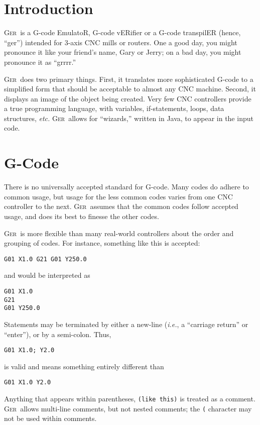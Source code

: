 \documentclass[titlepage,oneside,10pt]{article}
\newcommand{\ger}{\textsc{Ger}}
\begin{document}

\raggedbottom

\newcommand{\mymargin}[1]{\marginpar{\rm\tiny #1}}
\newcommand{\leftmar}[1]{\reversemarginpar \mymargin{#1}}

\section{Introduction}

\ger\ is a G-code EmulatoR, G-code vERifier or a G-code transpilER
(hence, ``ger'') intended for 3-axis CNC mills or routers. One a good
day, you might pronounce it like your friend's name, Gary or Jerry; on
a bad day, you might pronounce it as ``grrrr.''

\ger\ does two primary things. First, it translates more sophisticated
G-code to a simplified form that should be acceptable to almost any
CNC machine. Second, it displays an image of the object being
created. Very few CNC controllers provide a true programming language,
with variables, if-statements, loops, data structures, \emph{etc.}
\ger\ allows for ``wizards,'' written in Java, to appear in the input code. 


\section{G-Code}

There is no universally accepted standard for G-code. Many codes
do adhere to common usage, but usage for the less common codes varies
from one CNC controller to the next. \ger\ assumes that the common
codes follow accepted usage, and does its best to finesse the other
codes.

\ger\ is more flexible than many real-world controllers about the order
and grouping of codes. For instance, something like this is accepted:
\begin{verbatim}
G01 X1.0 G21 G01 Y250.0
\end{verbatim}
and would be interpreted as
\begin{verbatim}
G01 X1.0 
G21 
G01 Y250.0
\end{verbatim}
Statements may be terminated by either a new-line (\emph{i.e.}, a
``carriage return'' or ``enter''), or by a semi-colon. Thus,
\begin{verbatim}
G01 X1.0; Y2.0
\end{verbatim}
is valid and means something entirely different than 
\begin{verbatim}
G01 X1.0 Y2.0
\end{verbatim}
Anything that appears within parentheses, {\tt (like this)} is
treated as a comment. \ger\ allows multi-line comments, but not nested
comments; the {\tt \textquotesingle (\textquotesingle} character may
not be used within comments.
\end{document}
